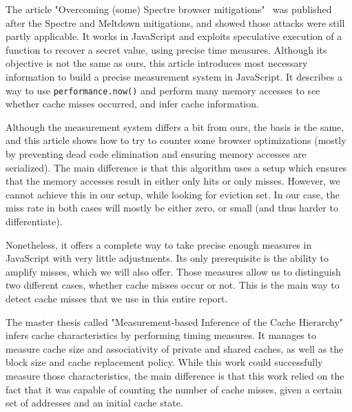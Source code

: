 \documentclass[a4paper,11pt,oneside]{report}
\begin{document}



The article "Overcoming (some) Spectre browser mitigations"~\cite{aleph_spectre} was published after the Spectre and Meltdown mitigations, and showed those attacks were still partly applicable. It works in JavaScript and exploits speculative execution of a function to recover a secret value, using precise time measures. Although its objective is not the same as ours, this article introduces most necessary information to build a precise measurement system in JavaScript. It describes a way to use \texttt{performance.now()} and perform many memory accesses to see whether cache misses occurred, and infer cache information.

Although the measurement system differs a bit from ours, the basis is the same, and this article shows how to try to counter some browser optimizations (mostly by preventing dead code elimination and ensuring memory accesses are serialized). The main difference is that this algorithm uses a setup which ensures that the memory accesses result in either only hits or only misses. However, we cannot achieve this in our setup, while looking for eviction set. In our case, the miss rate in both cases will mostly be either zero, or small (and thus harder to differentiate).

Nonetheless, it offers a complete way to take precise enough measures in JavaScript with very little adjustments. Its only prerequisite is the ability to amplify misses, which we will also offer. Those measures allow us to distinguish two different cases, whether cache misses occur or not. This is the main way to detect cache misses that we use in this entire report.


The master thesis called "Measurement-based Inference of the Cache Hierarchy"~\cite{abel} infers cache characteristics by performing timing measures. It manages to measure cache size and associativity of private and shared caches, as well as the block size and cache replacement policy. While this work could successfully measure those characteristics, the main difference is that this work relied on the fact that it was capable of counting the number of cache misses, given a certain set of addresses and an initial cache state.
\end{document}
